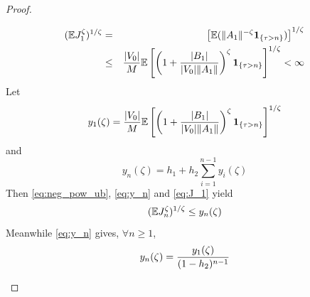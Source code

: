 \documentclass[aoas,preprint]{imsart}
\numberwithin{equation}{section}
\theoremstyle{plain}
\begin{document}
\begin{proof}
\begin{enumerate}
      \begin{eqnarray}
        (\mathbb{E} J_1^\zeta)^{1/\zeta} &=&
        \left[
        \mathbb{E} (\|A_1\|^{-\zeta}\mathbf{1}_{\{\tau > n\}})
      \right]^{1/\zeta} \nonumber \\
      &\leq&
      {|V_0|\over M} \mathbb{E} \left[\left(
        1 + {|B_1| \over |V_0| \|A_1\|}
      \right)^\zeta
      \mathbf{1}_{\{\tau > n\}}\right]^{1/\zeta}< \infty
    \label{eq:J_1}
    \end{eqnarray}
    Let
    \[
    y_1(\zeta) = 
    {|V_0|\over M} \mathbb{E} \left[\left(
        1 + {|B_1| \over |V_0| \|A_1\|}
      \right)^\zeta \mathbf{1}_{\{\tau > n\}}\right]^{1/\zeta}
    \]
    and
    \begin{equation}
      \label{eq:y_n}
      y_n(\zeta) = h_1 + h_2 \sum_{i=1}^{n-1} y_i(\zeta)
    \end{equation}
    Then \eqref{eq:neg_pow_ub}, \eqref{eq:y_n} and \eqref{eq:J_1}
    yield
    \begin{equation}
      \label{eq:J_n_2}
      (\mathbb{E} J_n^\zeta)^{1/\zeta} \leq y_n(\zeta)
    \end{equation}
    Meanwhile \eqref{eq:y_n} gives, $\forall n \geq 1$,
    \begin{equation}
      \label{eq:y_n_2}
      y_n(\zeta) = {y_1(\zeta) \over (1 - h_2)^{n-1}}
    \end{equation}


\end{enumerate}
\end{proof}
\end{document}
